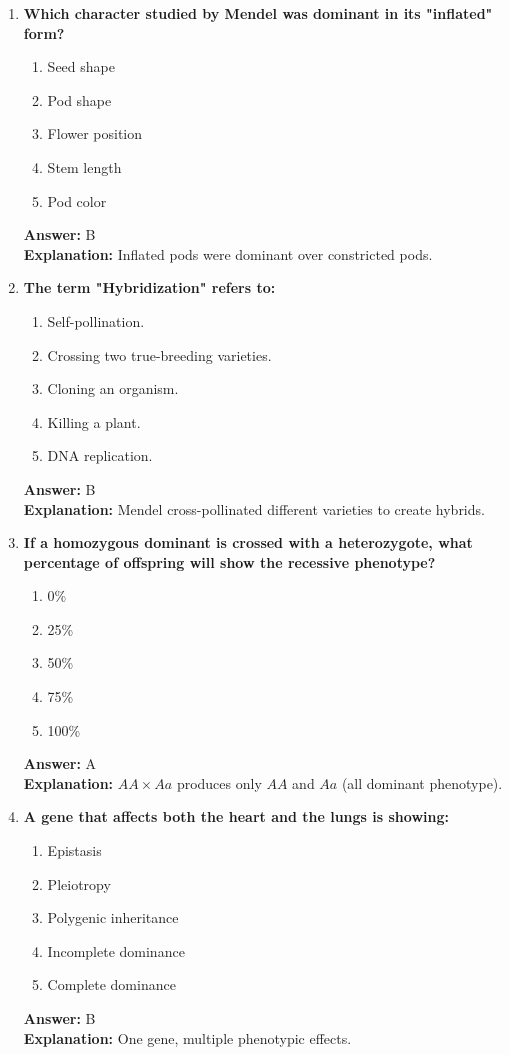 \documentclass[11pt, a4paper]{article}
\begin{document}
\begin{enumerate}[leftmargin=*, label=\arabic*.]
\item \textbf{Which character studied by Mendel was dominant in its "inflated" form?}
\begin{enumerate}[label=\Alph*.]
\item Seed shape
\item Pod shape
\item Flower position
\item Stem length
\item Pod color
\end{enumerate}
\textbf{Answer:} B \\
\textbf{Explanation:} Inflated pods were dominant over constricted pods.

\item \textbf{The term "Hybridization" refers to:}
\begin{enumerate}[label=\Alph*.]
\item Self-pollination.
\item Crossing two true-breeding varieties.
\item Cloning an organism.
\item Killing a plant.
\item DNA replication.
\end{enumerate}
\textbf{Answer:} B \\
\textbf{Explanation:} Mendel cross-pollinated different varieties to create hybrids.

\item \textbf{If a homozygous dominant is crossed with a heterozygote, what percentage of offspring will show the recessive phenotype?}
\begin{enumerate}[label=\Alph*.]
\item 0\%
\item 25\%
\item 50\%
\item 75\%
\item 100\%
\end{enumerate}
\textbf{Answer:} A \\
\textbf{Explanation:} $AA \times Aa$ produces only $AA$ and $Aa$ (all dominant phenotype).

\item \textbf{A gene that affects both the heart and the lungs is showing:}
\begin{enumerate}[label=\Alph*.]
\item Epistasis
\item Pleiotropy
\item Polygenic inheritance
\item Incomplete dominance
\item Complete dominance
\end{enumerate}
\textbf{Answer:} B \\
\textbf{Explanation:} One gene, multiple phenotypic effects.


\end{enumerate}
\end{document}
